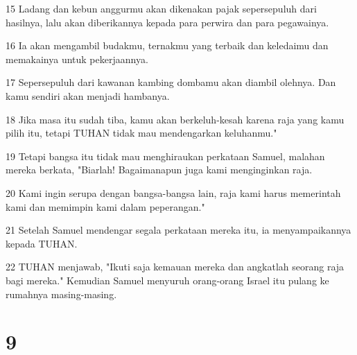 \par 15 Ladang dan kebun anggurmu akan dikenakan pajak sepersepuluh dari hasilnya, lalu akan diberikannya kepada para perwira dan para pegawainya.
\par 16 Ia akan mengambil budakmu, ternakmu yang terbaik dan keledaimu dan memakainya untuk pekerjaannya.
\par 17 Sepersepuluh dari kawanan kambing dombamu akan diambil olehnya. Dan kamu sendiri akan menjadi hambanya.
\par 18 Jika masa itu sudah tiba, kamu akan berkeluh-kesah karena raja yang kamu pilih itu, tetapi TUHAN tidak mau mendengarkan keluhanmu."
\par 19 Tetapi bangsa itu tidak mau menghiraukan perkataan Samuel, malahan mereka berkata, "Biarlah! Bagaimanapun juga kami menginginkan raja.
\par 20 Kami ingin serupa dengan bangsa-bangsa lain, raja kami harus memerintah kami dan memimpin kami dalam peperangan."
\par 21 Setelah Samuel mendengar segala perkataan mereka itu, ia menyampaikannya kepada TUHAN.
\par 22 TUHAN menjawab, "Ikuti saja kemauan mereka dan angkatlah seorang raja bagi mereka." Kemudian Samuel menyuruh orang-orang Israel itu pulang ke rumahnya masing-masing.

\chapter{9}

